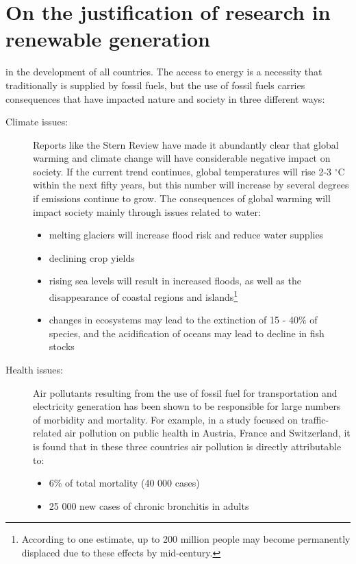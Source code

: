\section{On the justification of research in renewable generation} %
\label{sec:justification}
 in the development of all countries. The access to energy is a necessity that traditionally is supplied by fossil fuels, but the use of fossil fuels carries consequences that have impacted nature and society in three different ways:
\begin{description}
	\item[Climate issues:] Reports like the Stern Review have made it abundantly clear that global warming and climate change will have considerable negative impact on society. If the current trend continues, global temperatures will rise 2-3 $^\circ$C within the next fifty years, but this number will increase by several degrees if emissions continue to grow. The consequences of global warming will impact society mainly through issues related to water:
		\begin{itemize}
			\item melting glaciers will increase flood risk and reduce water supplies
			\item declining crop yields
			\item rising sea levels will result in increased floods, as well as the disappearance of coastal regions and islands\footnote{According to one estimate, up to 200 million people may become permanently displaced due to these effects by mid-century\cite{stern2006stern}.}
			\item changes in ecosystems may lead to the extinction of 15 - 40\% of species, and the acidification of oceans may lead to decline in fish stocks
		\end{itemize}
	\item[Health issues:] Air pollutants resulting from the use of fossil fuel for transportation and electricity generation has been shown to be responsible for large numbers of morbidity and mortality. For example, in a study focused on traffic-related air pollution on public health in Austria, France and Switzerland, it is found that in these three countries air pollution is directly attributable to:
		\begin{itemize}
			\item 6\% of total mortality (40 000 cases)
			\item 25 000 new cases of chronic bronchitis in adults

\end{itemize}
\end{description}

